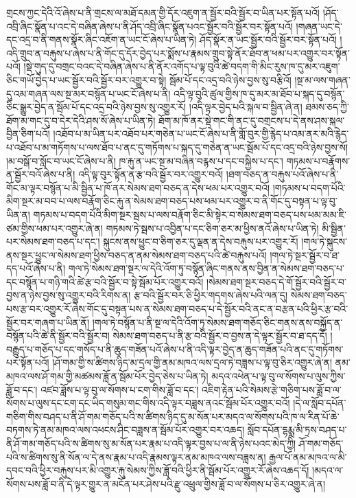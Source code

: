 གྲངས་ཀྱང་དེའི་འོ་ཞེས་པ་ནི་གྲངས་ལ་མཐོ་དམན་གྱི་དོར་འཇུག་ན་སྦྱོར་བའི་སྦྱོར་བ་ཡིན་པར་སྟོན་པའོ། །ཤོད་འབྲི་ཞིང་སྣོན་པ་འང་དེ་བཞིན་ཞེས་པ་ནི་ཤོད་འབྲི་ཞིང་སྣོན་པའང་སྦྱོར་བའི་སྦྱོར་བར་སྟོན་པའོ། །གཞན་ཡང་དེ་དང་འདྲ་བ་ནི་གནས་སྣོར་ཞིང་འཇོག་ན་ཡང་ངོ་ཞེས་པ་ཡིན་ཏེ། ཤོད་སྣོར་ན་ཡང་སྦྱོར་བའི་སྦྱོར་བར་སྟོན་པའོ། །འདི་གྲུབ་ན་བརྐུས་པ་ཞེས་པ་ནི་གོང་དུ་དོར་བྱེད་པར་སྨོས་པ་རྣམས་གྲུབ་སྟེ་ནོར་ཐོབ་ན་ཕམ་པར་འགྱུར་བར་སྟོན་པའོ། །སྡེ་གུད་དུ་བགྲང་བའང་དེ་བཞིན་ཞེས་པ་ནི་ནོར་འགོད་པ་ལྟ་བུའི་ཚེ་བདག་གི་མིང་རུས་ཁ་དུ་མར་འཇུག་ཅིང་གཡོ་བྱེད་པ་ཡང་སྦྱོར་བའི་སྦྱོར་བར་འགྱུར་བ་སྟེ། སྦོམ་པོ་དང་འདྲ་བའི་ཉེས་བྱས་སུ་བརྩིའོ། །སྔ་མ་ལས་གཞན་དུ་འམ་གཞན་ལས་སྔ་མར་བསྙོན་པ་ཡང་ངོ་ཞེས་པ་ནི། འདི་ལྟ་བུའི་ཚུལ་གྱིས་ཁ་དུ་མར་མ་ཐོབ་པ་སྐད་དུ་བསྙོན་ཅིང་སྒྱུར་བྱེད་ན་སྦོམ་པོ་དང་འདྲ་བའི་ཉེས་བྱས་སུ་འགྱུར་རོ། །འདི་ལྟར་བྱེད་པའི་སྐལ་བ་སྦྱིན་ཞེ་ན། ཐམས་ཅད་ཀྱི་ཐོག་མ་གང་དུ་བ་དེར་དེའི་ཤས་སོ་ཞེས་པ་ཡིན་ཏེ། ཐོག་མ་ཁོ་ནར་སྡེ་གང་གི་ནང་དུ་བགྲངས་པ་དེ་ནས་ཤས་སྐལ་བྱིན་ཅིག་པའོ། །འཐོབ་པ་མ་ཡིན་པར་འཐོབ་པར་གཅེན་པ་ཡང་ངོ་ཞེས་པ་ནི་གློ་བུར་གྱི་རྙེད་པ་འམ་ནར་མའི་རྙེད་པ་འཐོབ་པ་མ་གཏོགས་པ་ལས་ཐོབ་པ་ནང་དུ་གཏོགས་པ་སྐད་དུ་གཅེན་ན་ཡང་སྦོམ་པོ་དང་འདྲ་བའི་ཉེས་བྱས་སོ། །མ་བསྒོ་བ་སློང་བ་ཡང་ངོ་ཞེས་པ་ནི། ཁ་རྐུ་ན་ཡང་སྔ་མ་བཞིན་བརྙས་པ་དང་བསྐྱིས་པ་དང་། གཏམས་པ་བརྣོགས་ན་སྦྱོར་བའོ་ཞེས་པ་ནི། འདི་ལྟ་བུར་སྟོན་ན་རྩ་བའི་སྦྱོར་བར་འགྱུར་བའོ། །ཐག་བཅད་ན་བརྐུས་པའོ་ཞེས་པ་ནི་གོང་མ་ལྟར་བསྙོན་པ་མི་སྦྱིན་པ་ཁོ་ནར་སེམས་ཐག་བཅད་ན་དེས་ཕམ་པར་འགྱུར་བའོ། །གཏམས་པ་བདག་པོའི་མིག་སྔར་མ་བབ་པ་ལས་བརྣོག་ཅིང་རྐུ་ན་སེམས་ཐག་བཅད་པས་ཕམ་པར་འགྱུར་བ་ནི་གོང་དུ་བསྟན་པ་ལྟ་བུ་ཡིན་ན། གཏམས་པ་བདག་པོའི་མིག་སྔར་སྦས་པ་ལས་བརྣོག་ཅིང་མི་སྟེར་བ་སེམས་ཐག་བཅད་པས་ཕམ་མམ་ཇི་ཙམ་གྱིས་ཕམ་པར་འགྱུར་ཞེ་ན། གཏམས་ཏེ་སྦས་པ་འབྱིན་པ་དང་ཅིག་ཅར་མ་ཕྱིས་ནའོ་ཞེས་པ་ཡིན་ཏེ། མི་སྦྱིན་པར་སེམས་ཐག་བཅད་པ་དང་། སྐུངས་ནས་ཕྱུང་བ་ཅིག་ཅར་དུ་ལྡན་ན་དེས་བརྐུས་པར་འགྱུར་རོ། །གལ་ཏེ་སྐུངས་ནས་སྔར་ཕྱུང་ལ་སེམས་ཐག་ཕྱིས་བཅད་ན་ནམ་སེམས་ཐག་བཅད་པའི་ཚེ་བརྐུས་པའོ། །གལ་ཏེ་སྔར་སྦྱོར་བ་ཐ་དད་པའོ་ཞེས་པ་ནི། གལ་ཏེ་སེམས་ཐག་སྔར་ལ་དེའི་འོག་ཏུ་བསྙོན་ཞིང་གནས་ནས་བྱིན་ན་སེམས་ཐག་བཅད་པ་དང་བསྙོན་པ་གཉི་གའི་ཚེ་རྩ་བའི་སྦྱོར་བ་སྟེ་སྦོམ་པོར་འགྱུར་བའོ། །སེམས་ཐག་སྔར་བཅད་དེ་གོ་སྦྱོར་བའི་སྦྱོར་བ་བྱས་ན་ཉེས་བྱས་སུ་འགྱུར་བའི་རིགས་ན། རྩ་བའི་སྦྱོར་བར་ཅི་ཕྱིར་གདགས་ཞེས་པའི་ལན་དུ། སེམས་ཐག་བཅད་པས་རྩ་བར་འགྱུར་རོ་ཞེས་གོང་དུ་བསྟན་པས་ན་སེམས་ཐག་བཅད་པ་དེ་སྦྱོར་བའི་ནང་ན་བརྩན་པའི་ཕྱིར་རྩ་བའི་སྦྱོར་བར་གཞག་པ་ཡིན་ནོ། །གལ་ཏེ་བསྙོན་པ་ནི་སྔ་ལ་དེའི་འོག་ཏུ་སེམས་ཐག་གཅོད་ཅིང་གནས་ནས་བསྐྱོད་ན་བསྙོན་པའི་ཚེ་ནི་སྦྱོར་བའི་སྦྱོར་བ། སེམས་ཐག་བཅད་པ་ནི་རྩ་བའི་སྦྱོར་བ་བྱས་ན་དེ་ལྟར་སྦྱོར་བ་ཐ་དད་དོ། །བརྒྱུད་པ་གཅོད་པ་དང་གསོད་པ་ནི་ཆུད་གཟོན་པའོ་ཞེས་པ་ནི་འདི་ལྟར་བྱེད་ན་ཆུད་གཟོན་པའི་ནང་དུ་གཏོགས་པར་སྟོན་པའོ། །ཤོ་གམ་གྱི་ས་ཚིགས་ཉིད་མ་དྲལ་གྱི་ནམ་མཁའ་ལས་དྲལ་ཏེ་བཟླས་པ་ལྟ་བུ་ཅིར་འགྱུར་ཞེ་ན། ནམ་མཁའ་ལས་ཤོ་གམ་གྱི་མཚམས་ཟློ་ན་སྦོམ་པོར་བྱེད་ཅེས་པ་ཡིན་ཏེ། མདའ་འཕེན་པ་ལྟ་བུ་ལ་སོགས་པ་ལུས་ཀྱིས་ཟློ་བ་དང་། འཛབ་ཟློས་པ་ལྟ་བུ་ལ་སོགས་པ་ངག་གིས་ཟློ་བ་དང་། འཇིག་རྟེན་པའི་སེམས་རྩེ་གཅིག་པས་ཟློ་བ་ལ་སོགས་པ་ལུས་དང་ངག་དང་ཡིད་གསུམ་གང་གིས་འདི་ལྟར་བཟླས་ནའང་སྦོམ་པོར་འགྱུར་བའོ། །དེ་ལ་སློབ་དཔོན་གཅིག་གིས་བཤད་པ་ནི་ཤོ་གམ་གཅོད་པའི་ས་ཚིགས་ཉིད་དུ་མ་སོན་པར་མདའ་ལ་སོགས་པའི་ཁ་ལ་རིན་པོ་ཆེ་བཏགས་ཏེ་ནམ་མཁའ་ལས་འཕངས་ཤིང་བཟླས་ན་སྦོམ་པོར་འགྱུར་བར་འཆད། སློབ་དཔོན་དྷརྨྨ་མི་ཏྲས་བཤད་པ་ནི་ཤོ་གམ་གཅོད་པའི་ས་ཚིགས་སུ་མ་སོན་པར་རྣམ་པ་འདི་ལྟར་བྱས་པ་ལ་ནི་ཉེས་པའང་མེད་ཀྱི། ཤོ་གམ་གཅོད་པའི་ས་ཚིགས་སུ་ནི་སོན་ལ་དེ་ནས་རྣམ་པ་འདི་རྣམས་ལྟར་ནམ་མཁའ་ལས་བཟླས་ན། རྒྱལ་པོ་ནམ་མཁའ་ལ་མི་དབང་བའི་ཕྱིར་བརྐུས་པར་མི་འགྱུར་རྐུ་སེམས་ཀྱིས་ཟློ་བའི་ཕྱིར་ནི་སྦོམ་པོར་འགྱུར་རོ་ཞེས་འཆད་དོ། །མདའ་ལ་སོགས་པས་ཟློ་བ་ནི་དེ་ལྟར་གྱུར་ན་མངོན་པར་ཤེས་པའི་རྫུ་འཕྲུལ་གྱིས་ཟློ་བ་ལ་སོགས་པ་ཅིར་འགྱུར་ཞེ་ན། 